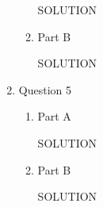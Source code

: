 \documentclass[12pt]{article}
\begin{document}
\begin{enumerate}
\begin{enumerate}
  SOLUTION

  \item Part B  %

  SOLUTION
  \end{enumerate}
\newpage

\item Question 5
  \begin{enumerate}
  \item Part A  %

  SOLUTION

  \item Part B  %

  SOLUTION
  \end{enumerate}
\newpage

\end{enumerate}
\end{document}
